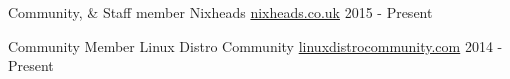 


\begin{cvhonors}


\cvhonor
{Community, \& Staff member} %
{Nixheads} %
{\href{http://nixheads.co.uk/}{nixheads.co.uk}} %
{2015 - Present} %
    

\cvhonor
{Community Member} %
{Linux Distro Community} %
{\href{https://www.linuxdistrocommunity.com/}{linuxdistrocommunity.com}} %
{2014 - Present} %


\end{cvhonors}
